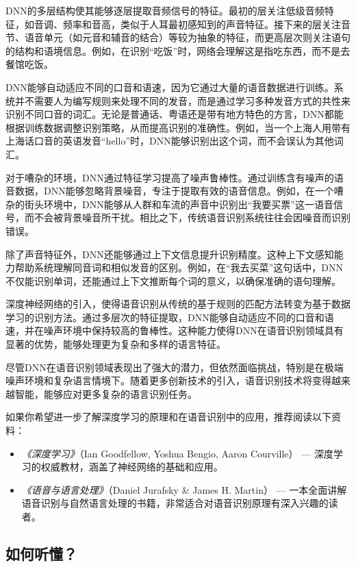 DNN的多层结构使其能够逐层提取音频信号的特征。最初的层关注低级音频特征，如音调、频率和音高，类似于人耳最初感知到的声音特征。接下来的层关注音节、语音单元（如元音和辅音的结合）等较为抽象的特征，而更高层次则关注语句的结构和语境信息。例如，在识别“吃饭”时，网络会理解这是指吃东西，而不是去餐馆吃饭。

DNN能够自动适应不同的口音和语速，因为它通过大量的语音数据进行训练。系统并不需要人为编写规则来处理不同的发音，而是通过学习多种发音方式的共性来识别不同口音的词汇。无论是普通话、粤语还是带有地方特色的方言，DNN都能根据训练数据调整识别策略，从而提高识别的准确性。例如，当一个上海人用带有上海话口音的英语发音“hello”时，DNN能够识别出这个词，而不会误认为其他词汇。

对于嘈杂的环境，DNN通过特征学习提高了噪声鲁棒性。通过训练含有噪声的语音数据，DNN能够忽略背景噪音，专注于提取有效的语音信息。例如，在一个嘈杂的街头环境中，DNN能够从人群和车流的声音中识别出“我要买票”这一语音信号，而不会被背景噪音所干扰。相比之下，传统语音识别系统往往会因噪音而识别错误。

除了声音特征外，DNN还能够通过上下文信息提升识别精度。这种上下文感知能力帮助系统理解同音词和相似发音的区别。例如，在“我去买菜”这句话中，DNN不仅能识别单词，还能通过上下文推断每个词的意义，以确保准确的语句理解。

深度神经网络的引入，使得语音识别从传统的基于规则的匹配方法转变为基于数据学习的识别方法。通过多层次的特征提取，DNN能够自动适应不同的口音和语速，并在噪声环境中保持较高的鲁棒性。这种能力使得DNN在语音识别领域具有显著的优势，能够处理更为复杂和多样的语言特征。

尽管DNN在语音识别领域表现出了强大的潜力，但依然面临挑战，特别是在极端噪声环境和复杂语言情境下。随着更多创新技术的引入，语音识别技术将变得越来越智能，能够应对更多复杂的语言识别任务。

如果你希望进一步了解深度学习的原理和在语音识别中的应用，推荐阅读以下资料：
\begin{itemize}
    \item \textit{《深度学习》}（Ian Goodfellow, Yoshua Bengio, Aaron Courville） — 深度学习的权威教材，涵盖了神经网络的基础和应用。
    \item \textit{《语音与语言处理》}（Daniel Jurafsky \& James H. Martin） — 一本全面讲解语音识别与自然语言处理的书籍，非常适合对语音识别原理有深入兴趣的读者。
\end{itemize}



\subsection{如何听懂？}

